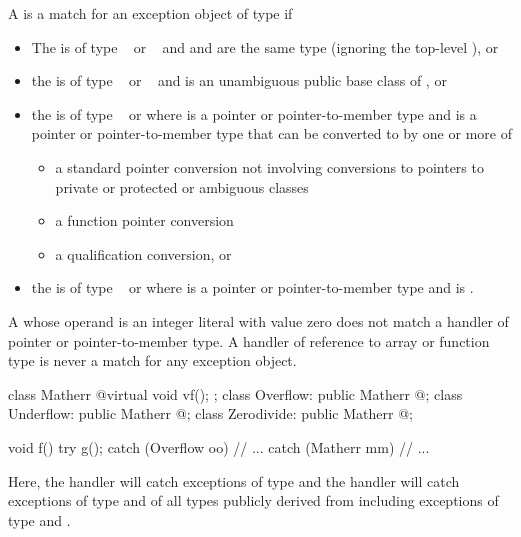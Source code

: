 \pnum
{}%
A
is a match for
an exception object
of type
if
\begin{itemize}
\item%
The  is of type \cv{}~ or
\cv{}~ and
 and 
are the same type (ignoring the top-level ), or
\item%
the  is of type \cv{}~ or
\cv{}~ and
 is an unambiguous public base class of , or
\item%
the  is of type \cv{}~ or 
where  is a pointer or pointer-to-member type and
 is a pointer or pointer-to-member type
that can be converted to  by one or more of
\begin{itemize}

\item%
a standard pointer conversion not involving conversions
to pointers to private or protected or ambiguous classes
\item%
a function pointer conversion
\item%
a qualification conversion, or

\end{itemize}

\item
the  is of type \cv{}~ or  where  is a pointer or pointer-to-member type and  is .

\end{itemize}

\begin{note}
A
whose operand is an integer literal with value zero does not match a handler of
pointer or pointer-to-member type.
A handler of reference to array or function type
is never a match for any exception object.
\end{note}

\begin{example}
\begin{codeblock}
class Matherr { @\commentellip@ virtual void vf(); };
class Overflow: public Matherr { @\commentellip@ };
class Underflow: public Matherr { @\commentellip@ };
class Zerodivide: public Matherr { @\commentellip@ };

void f() {
  try {
    g();
  } catch (Overflow oo) {
    // ...
  } catch (Matherr mm) {
    // ...
  }
}
\end{codeblock}
Here, the
handler will catch exceptions of type
and the
handler will catch exceptions of type
and of all types publicly derived from
including exceptions of type
and
.
\end{example}

